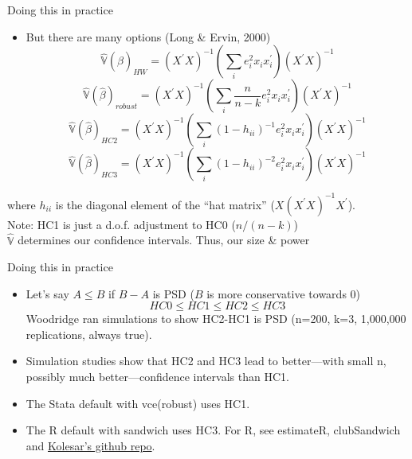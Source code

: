 \begin{frame}{Doing this in practice}
\begin{itemize}
    \item But there are many options (Long \& Ervin, 2000)
    \begin{equation}
        \hat{\mathbb{V}}(\hat{\beta})_{HW}=(X^{\prime}X)^{-1}\left(\sum_{i} e_i^2 x_{i}x_{i}^{\prime}\right) (X^{\prime}X)^{-1} \tag{HC0}
    \end{equation}
    \begin{equation}
        \hat{\mathbb{V}}(\hat{\beta})_{robust}=(X^{\prime}X)^{-1}\left(\sum_{i} \frac{n}{n-k} e_i^2 x_{i}x_{i}^{\prime}\right) (X^{\prime}X)^{-1} \tag{HC1}
    \end{equation}
    \begin{equation}
        \hat{\mathbb{V}}(\hat{\beta})_{HC2}=(X^{\prime}X)^{-1}\left(\sum_{i} (1-h_{ii})^{-1}e_i^2 x_{i}x_{i}^{\prime}\right)(X^{\prime}X)^{-1} \tag{HC2}
    \end{equation}
     \begin{equation}
        \hat{\mathbb{V}}(\hat{\beta})_{HC3}=(X^{\prime}X)^{-1}\left(\sum_{i} (1-h_{ii})^{-2}e_i^2 x_{i}x_{i}^{\prime}\right) (X^{\prime}X)^{-1} \tag{HC3}
    \end{equation}
\end{itemize}
where $h_{ii}$ is the diagonal element of the ``hat matrix'' ($X(X^{\prime}X)^{-1}X^{\prime}$).\\
Note: HC1 is just a d.o.f. adjustment to HC0 ($n/(n-k)$)\\
$\hat{\mathbb{V}}$ determines our confidence intervals. Thus, our size \& power


\end{frame}

\begin{frame}{Doing this in practice}
\begin{itemize}
    \item Let's say $A\leq B$ if $B-A$ is PSD ($B$ is more conservative towards 0)
    $$HC0\leq HC1\leq HC2\leq HC3$$
    Woodridge ran simulations to show HC2-HC1 is PSD (n=200, k=3, 1,000,000 replications, always true).
    \item Simulation studies show that HC2 and HC3 lead to better---with small n, possibly much better---confidence intervals than HC1.
    \item The Stata default with vce(robust) uses HC1.
    \item The R default with sandwich uses HC3. For R, see estimateR, clubSandwich and \hyperlink{https://github.com/kolesarm/Robust-Small-Sample-Standard-Errors}{Kolesar's github repo}.
\end{itemize}
\end{frame}

